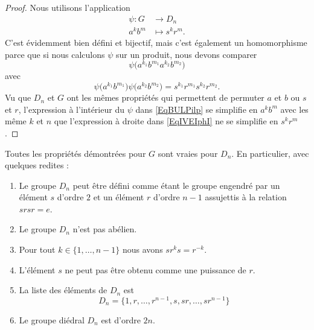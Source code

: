 \begin{proof}
        Nous utilisons l'application
    \begin{equation}
        \begin{aligned}
            \psi\colon G&\to D_n \\
            a^kb^m&\mapsto s^kr^m.
        \end{aligned}
    \end{equation}
    C'est évidemment bien défini et bijectif, mais c'est également un homomorphisme parce que si nous calculons \( \psi\) sur un produit, nous devons comparer
    \begin{equation}        \label{EqBULPilp}
        \psi\big( a^{k_1}b^{m_1}a^{k_2}b^{m_2} \big)
    \end{equation}
    avec
    \begin{equation}        \label{EqIVEIphI}
        \psi\big( a^{k_1}b^{m_1}\big)\psi\big(a^{k_2}b^{m_2} \big)= s^{k_1}r^{m_1}s^{k_2}r^{m_2}.
    \end{equation}
    Vu que \( D_n\) et \( G\) ont les mêmes propriétés qui permettent de permuter \( a\) et \( b\) ou \( s\) et \( r\), l'expression à l'intérieur du \( \psi\) dans \eqref{EqBULPilp} se simplifie en \( a^kb^m\) avec les même \( k\) et \( n\) que l'expression à droite dans \eqref{EqIVEIphI} ne se simplifie en \( s^kr^m\).
\end{proof}

\begin{corollary}
    Toutes les propriétés démontrées pour \( G\) sont vraies pour \( D_n\). En particulier, avec quelques redites :
    \begin{enumerate}
        \item
            Le groupe \( D_n\) peut être défini comme étant le groupe engendré par un élément \( s\) d'ordre \( 2\) et un élément \( r\) d'ordre \( n-1\) assujettis à la relation \( srsr=e\).
        \item
            Le groupe \( D_n\) n'est pas abélien.
        \item
            Pour tout \( k\in\{ 1,\ldots, n-1 \}\) nous avons \( sr^ks=r^{-k}\).
        \item
            L'élément \( s\) ne peut pas être obtenu comme une puissance de \( r\).
        \item
            La liste des éléments de \( D_n\) est
            \begin{equation}
                D_n=\{ 1,r,\ldots, r^{n-1},s,sr,\ldots, sr^{n-1} \}
            \end{equation}
        \item
            Le groupe diédral \( D_n\) est d'ordre \( 2n\).
    \end{enumerate}
\end{corollary}

